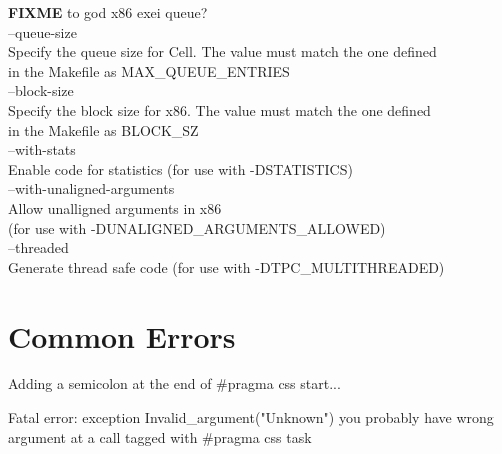 \documentclass[letterpaper]{article}
\begin{document}
\textbf{FIXME} to god x86 exei queue?\\
  --queue-size\\
          Specify the queue size for Cell. The value must match the one defined\\
          in the Makefile as MAX\_QUEUE\_ENTRIES\\

  --block-size\\
          Specify the block size for x86.  The value must match the one defined\\
          in the Makefile as BLOCK\_SZ\\

  --with-stats\\
          Enable code for statistics (for use with -DSTATISTICS)\\

  --with-unaligned-arguments\\
          Allow unalligned arguments in x86\\
          (for use with -DUNALIGNED\_ARGUMENTS\_ALLOWED)\\

  --threaded\\
          Generate thread safe code (for use with -DTPC\_MULTITHREADED)\\

\section{Common Errors}

Adding a semicolon at the end of #pragma css start...

Fatal error: exception Invalid_argument("Unknown") you probably have wrong argument at a call tagged with #pragma css task
\end{document}
